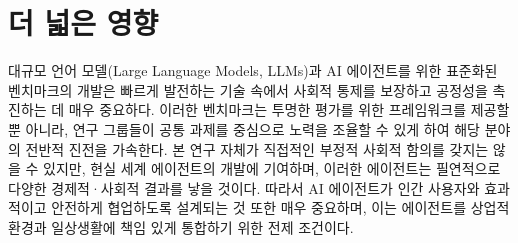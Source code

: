 \section*{더 넓은 영향}

대규모 언어 모델(Large Language Models, LLMs)과 AI 에이전트를 위한 표준화된 벤치마크의 개발은 빠르게 발전하는 기술 속에서 사회적 통제를 보장하고 공정성을 촉진하는 데 매우 중요하다. 이러한 벤치마크는 투명한 평가를 위한 프레임워크를 제공할 뿐 아니라, 연구 그룹들이 공통 과제를 중심으로 노력을 조율할 수 있게 하여 해당 분야의 전반적 진전을 가속한다. 본 연구 자체가 직접적인 부정적 사회적 함의를 갖지는 않을 수 있지만, 현실 세계 에이전트의 개발에 기여하며, 이러한 에이전트는 필연적으로 다양한 경제적·사회적 결과를 낳을 것이다. 따라서 AI 에이전트가 인간 사용자와 효과적이고 안전하게 협업하도록 설계되는 것 또한 매우 중요하며, 이는 에이전트를 상업적 환경과 일상생활에 책임 있게 통합하기 위한 전제 조건이다.

